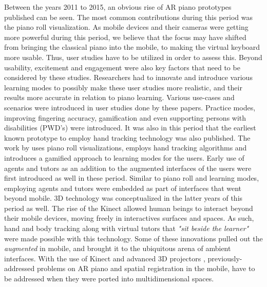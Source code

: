 \documentclass[manuscript,screen]{acmart}
\begin{document}
Between the years 2011 to 2015, an obvious rise of AR piano prototypes published can be seen. The most common contributions during this period was the piano roll visualization. As mobile devices and their cameras were getting more powerful during this period, we believe that the focus may have shifted from bringing the classical piano into the mobile, to making the virtual keyboard more usable. Thus, user studies have to be utilized in order to assess this. Beyond usability, excitement and engagement were also key factors that need to be considered by these studies. Researchers had to innovate and introduce various learning modes to possibly make these user studies more realistic, and their results more accurate in relation to piano learning. Various use-cases and scenarios were introduced in user studies done by these papers. Practice modes, improving fingering accuracy, gamification and even supporting persons with disabilities (PWD's) were introduced. It was also in this period that the earliest known prototype to employ hand tracking \cite{huang2011piano} technology was also published. The work by \citet{weing2013piano} uses piano roll visualizations, employs hand tracking algorithms and introduces a gamified approach to learning modes for the users. Early use of agents and tutors as an addition to the augmented interfaces of the users were first introduced as well in these period. Similar to piano roll and learning modes, employing agents and tutors were embedded as part of interfaces that went beyond mobile. 3D technology was conceptualized in the latter years of this period as well. The rise of the Kinect \cite{zhang2012microsoft} allowed human beings to interact beyond their mobile devices, moving freely in interactives surfaces and spaces. As such, hand and body tracking along with virtual tutors that \textit{"sit beside the learner"} were made possible with this technology. Some of these innovations pulled out the \textit{augmented} in mobile, and brought it to the ubiquitous arena of ambient interfaces. With the use of Kinect and advanced 3D projectors \cite{yang2012augmented}, previously-addressed problems on AR piano and spatial registration in the mobile, have to be addressed when they were ported into multidimensional spaces. 
\end{document}
